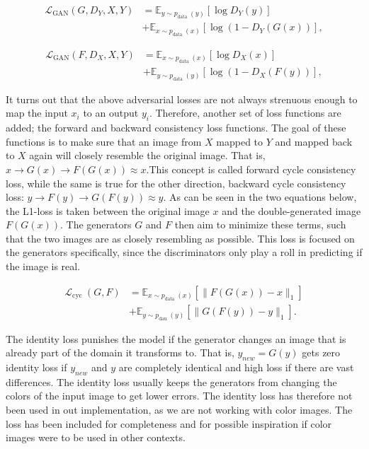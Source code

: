 \documentclass[12pt, fleqn, titlepage]{article}
\begin{document}
\[\begin{aligned}
	\mathcal{L}_{\mathrm{GAN}}\left(G, D_{Y}, X, Y\right) &=\mathbb{E}_{y \sim p_{\text {data }}(y)}\left[\log D_{Y}(y)\right] \\
	&+\mathbb{E}_{x \sim p_{\text {data }}(x)}\left[\log \left(1-D_{Y}(G(x))\right],\right.
\end{aligned}\]

\[\begin{aligned}
	\mathcal{L}_{\mathrm{GAN}}\left(F, D_{X}, X, Y\right) &=\mathbb{E}_{x \sim p_{\text {data }}(x)}\left[\log D_{X}(x)\right] \\
	&+\mathbb{E}_{y \sim p_{\text {data }}(y)}\left[\log \left(1-D_{X}(F(y))\right],\right.
\end{aligned}\]

It turns out that the above adversarial losses are not always strenuous enough to map the input $x_i$ to an output $y_i$. Therefore, another set of loss functions are added; the forward and backward consistency loss functions. The goal of these functions is to make sure that an image from $X$ mapped to $Y$ and mapped back to $X$ again will closely resemble the original image. That is, $x \rightarrow G(x) \rightarrow F(G(x)) \approx x$.This concept is called forward cycle consistency loss, while the same is true for the other direction, backward cycle consistency loss: $y \rightarrow F(y) \rightarrow G(F(y)) \approx y$. As can be seen in the two equations below, the L1-loss is taken between the original image $x$ and the double-generated image $F(G(x))$. The generators $G$ and $F$ then aim to minimize these terms, such that the two images are as closely resembling as possible. This loss is focused on the generators specifically, since the discriminators only play a roll in predicting if the image is real.

\[\begin{aligned}
	\mathcal{L}_{\text {cyc }}(G, F) &=\mathbb{E}_{x \sim p_{\text {data }}(x)}\left[\|F(G(x))-x\|_{1}\right] \\
	&+\mathbb{E}_{y \sim p_{\text {dau }}(y)}\left[\|G(F(y))-y\|_{1}\right] .
\end{aligned}\]

The identity loss punishes the model if the generator changes an image that is already part of the domain it transforms to. That is, $y_{new} = G(y)$ gets zero identity loss if $y_{new}$ and $y$ are completely identical and high loss if there are vast differences. The identity loss usually keeps the generators from changing the colors of the input image to get lower errors. The identity loss has therefore not been used in out implementation, as we are not working with color images. The loss has been included for completeness and for possible inspiration if color images were to be used in other contexts.
\end{document}
